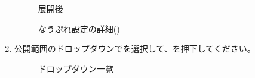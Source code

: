 \begin{enumerate}
\begin{figure}[htbp]
\begin{minipage}[b]{0.45\linewidth}
{                    }
                    \caption{展開後}
                    \label{img:guide2}
                \end{minipage}
                \caption*{\mi なうぷれ設定の詳細(\currentVersion)}
            \end{figure}

        \newpage
        \item 公開範囲のドロップダウンでを選択して、を押下してください。
            \begin{figure}[htbp]
                \begin{minipage}[b]{0.45\linewidth}
                    \centering
                    \caption{ドロップダウン一覧}
                    \label{img:guide3}
                \end{minipage}
                \begin{minipage}[b]{0.45\linewidth}
                    \centering
\end{minipage}
\end{figure}
\end{enumerate}
